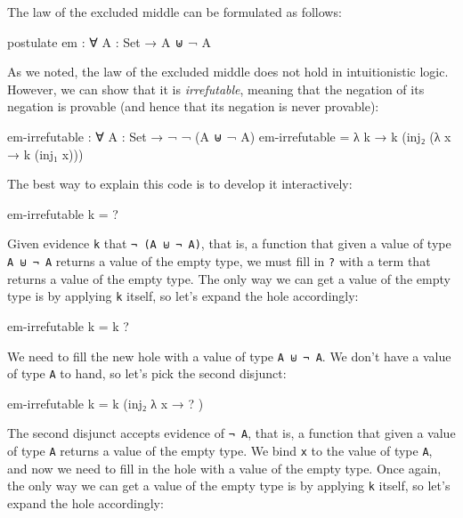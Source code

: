 The law of the excluded middle can be formulated as follows:

\begin{fence}
\begin{code}
postulate
  em : ∀ {A : Set} → A ⊎ ¬ A
\end{code}
\end{fence}

As we noted, the law of the excluded middle does not hold in
intuitionistic logic. However, we can show that it is
\emph{irrefutable}, meaning that the negation of its negation is
provable (and hence that its negation is never provable):

\begin{fence}
\begin{code}
em-irrefutable : ∀ {A : Set} → ¬ ¬ (A ⊎ ¬ A)
em-irrefutable = λ k → k (inj₂ (λ x → k (inj₁ x)))
\end{code}
\end{fence}

The best way to explain this code is to develop it interactively:

\begin{myDisplay}
em-irrefutable k = ?
\end{myDisplay}

Given evidence \texttt{k} that \texttt{¬\ (A\ ⊎\ ¬\ A)}, that is, a
function that given a value of type \texttt{A\ ⊎\ ¬\ A} returns a value
of the empty type, we must fill in \texttt{?} with a term that returns a
value of the empty type. The only way we can get a value of the empty
type is by applying \texttt{k} itself, so let's expand the hole
accordingly:

\begin{myDisplay}
em-irrefutable k = k ?
\end{myDisplay}

We need to fill the new hole with a value of type \texttt{A\ ⊎\ ¬\ A}.
We don't have a value of type \texttt{A} to hand, so let's pick the
second disjunct:

\begin{myDisplay}
em-irrefutable k = k (inj₂ λ{ x → ? })
\end{myDisplay}

The second disjunct accepts evidence of \texttt{¬\ A}, that is, a
function that given a value of type \texttt{A} returns a value of the
empty type. We bind \texttt{x} to the value of type \texttt{A}, and now
we need to fill in the hole with a value of the empty type. Once again,
the only way we can get a value of the empty type is by applying
\texttt{k} itself, so let's expand the hole accordingly:

